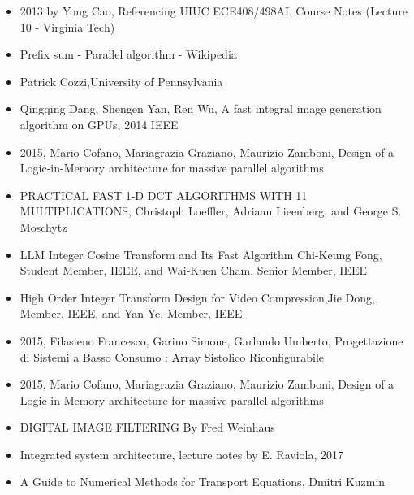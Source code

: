 \begin{itemize}
	\item  2013 by Yong Cao, Referencing UIUC ECE408/498AL Course Notes (Lecture 10 - Virginia Tech)
	\item Prefix sum - Parallel algorithm - Wikipedia
	\item Patrick Cozzi,University of Pennsylvania
	\item Qingqing Dang, Shengen Yan, Ren Wu, A fast integral image generation algorithm on GPUs, 2014 IEEE \\
		\item 2015, Mario Cofano, Mariagrazia Graziano, Maurizio Zamboni, Design of a Logic-in-Memory architecture for massive parallel algorithms

	\item PRACTICAL FAST 1-D DCT ALGORITHMS
	WITH 11 MULTIPLICATIONS, Christoph Loeffler, Adriaan Lieenberg, and George S. Moschytz
	\item LLM Integer Cosine Transform and Its Fast Algorithm 
	Chi-Keung Fong, Student Member, IEEE, and Wai-Kuen Cham, Senior Member, IEEE
	
	\item High Order Integer Transform Design for  Video Compression,Jie Dong, Member, IEEE, and Yan Ye, Member, IEEE\\  
	\item 2015, Filasieno Francesco, Garino Simone, Garlando Umberto, Progettazione di Sistemi a Basso Consumo : Array Sistolico Riconfigurabile
	\item 2015, Mario Cofano, Mariagrazia Graziano, Maurizio Zamboni, Design of a Logic-in-Memory architecture for massive parallel algorithms
	\item DIGITAL IMAGE FILTERING By Fred Weinhaus
	
	\item Integrated system architecture, lecture notes by E. Raviola, 2017
	
	\item A Guide to Numerical Methods for Transport Equations, Dmitri Kuzmin
	
		
	 
\end{itemize}


	
	
